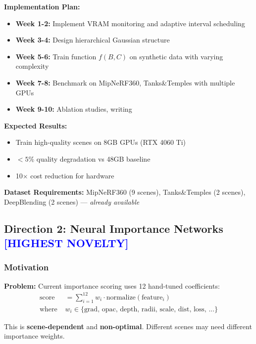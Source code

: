 \documentclass[11pt,letterpaper]{article}
\newcommand{\highlight}[1]{\textcolor{blue}{\textbf{#1}}}
\begin{document}
\textbf{Implementation Plan:}
\begin{itemize}[leftmargin=*]
    \item \textbf{Week 1-2:} Implement VRAM monitoring and adaptive interval scheduling
    \item \textbf{Week 3-4:} Design hierarchical Gaussian structure
    \item \textbf{Week 5-6:} Train function $f(B, C)$ on synthetic data with varying complexity
    \item \textbf{Week 7-8:} Benchmark on MipNeRF360, Tanks\&Temples with multiple GPUs
    \item \textbf{Week 9-10:} Ablation studies, writing
\end{itemize}

\textbf{Expected Results:}
\begin{itemize}[leftmargin=*]
    \item Train high-quality scenes on 8GB GPUs (RTX 4060 Ti)
    \item $<5\%$ quality degradation vs 48GB baseline
    \item 10$\times$ cost reduction for hardware
\end{itemize}

\textbf{Dataset Requirements:} MipNeRF360 (9 scenes), Tanks\&Temples (2 scenes), DeepBlending (2 scenes) — \textit{already available}

\subsection{Direction 2: Neural Importance Networks \highlight{[HIGHEST NOVELTY]}}

\subsubsection{Motivation}

\textbf{Problem:} Current importance scoring uses 12 hand-tuned coefficients:
\begin{align*}
\text{score} &= \sum_{i=1}^{12} w_i \cdot \text{normalize}(\text{feature}_i) \\
\text{where } &w_i \in \{\text{grad, opac, depth, radii, scale, dist, loss, ...}\}
\end{align*}

This is \textbf{scene-dependent} and \textbf{non-optimal}. Different scenes may need different importance weights.
\end{document}
